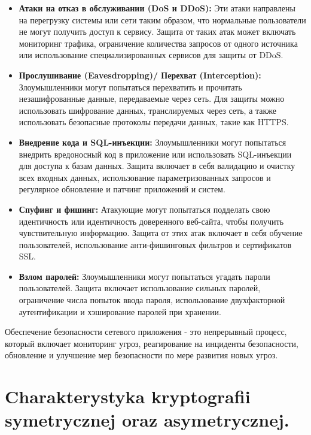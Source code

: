 \begin{itemize}
\item \textbf{Атаки на отказ в обслуживании (DoS и DDoS):} Эти атаки направлены на перегрузку системы или сети таким образом, что нормальные пользователи не могут получить доступ к сервису. Защита от таких атак может включать мониторинг трафика, ограничение количества запросов от одного источника или использование специализированных сервисов для защиты от DDoS.

\item \textbf{Прослушивание (Eavesdropping)/ Перехват (Interception):} Злоумышленники могут попытаться перехватить и прочитать незашифрованные данные, передаваемые через сеть. Для защиты можно использовать шифрование данных, транслируемых через сеть, а также использовать безопасные протоколы передачи данных, такие как HTTPS.

\item \textbf{Внедрение кода и SQL-инъекции:} Злоумышленники могут попытаться внедрить вредоносный код в приложение или использовать SQL-инъекции для доступа к базам данных. Защита включает в себя валидацию и очистку всех входных данных, использование параметризованных запросов и регулярное обновление и патчинг приложений и систем.

\item \textbf{Спуфинг и фишинг:} Атакующие могут попытаться подделать свою идентичность или идентичность доверенного веб-сайта, чтобы получить чувствительную информацию. Защита от этих атак включает в себя обучение пользователей, использование анти-фишинговых фильтров и сертификатов SSL.

\item \textbf{Взлом паролей:} Злоумышленники могут попытаться угадать пароли пользователей. Защита включает использование сильных паролей, ограничение числа попыток ввода пароля, использование двухфакторной аутентификации и хэширование паролей при хранении.
\end{itemize}

Обеспечение безопасности сетевого приложения - это непрерывный процесс, который включает мониторинг угроз, реагирование на инциденты безопасности, обновление и улучшение мер безопасности по мере развития новых угроз.

\section{Charakterystyka kryptografii symetrycznej oraz asymetrycznej.}


